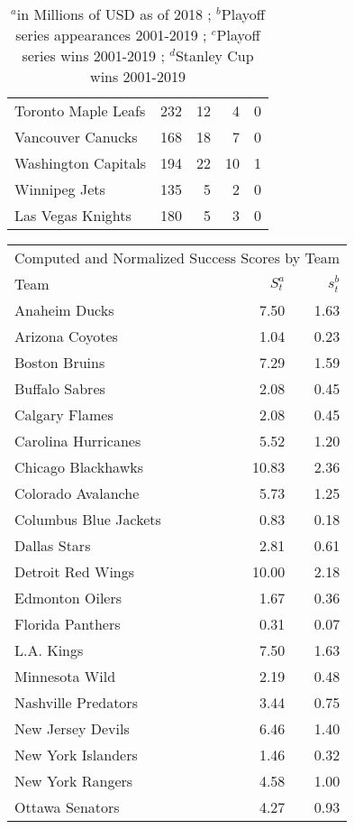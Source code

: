 \documentclass[11pt]{report}            %
\begin{document}
\begin{table}[htp]
\begin{tabular}{lrrrr}
Toronto Maple Leafs & 232 &  12 &   4 &   0 \\ 
Vancouver Canucks & 168 &  18 &   7 &   0 \\ 
Washington Capitals & 194 &  22 &  10 &   1 \\ 
Winnipeg Jets & 135 &   5 &   2 &   0 \\ 
Las Vegas Knights & 180 &   5 &   3 &   0 \\ 
\hline
\end{tabular}
\caption{$^a$in Millions of USD as of 2018 \cite{money}; $^b$Playoff series appearances 2001-2019 \cite{stats}; $^c$Playoff series wins 2001-2019 \cite{stats}; $^d$Stanley Cup wins 2001-2019 \cite{stats}}
\label{table:Revenue}
\end{table}

\begin{table}[htp]
\centering
\begin{tabular}{lrr}
\hline
\multicolumn{3}{c}{Computed and Normalized Success Scores by Team} \\
Team & $S_t^a$ & $s_t^b$ \\ 
\hline
Anaheim Ducks & 7.50 & 1.63 \\ 
Arizona Coyotes & 1.04 & 0.23 \\ 
Boston Bruins & 7.29 & 1.59 \\ 
Buffalo Sabres & 2.08 & 0.45 \\ 
Calgary Flames & 2.08 & 0.45 \\ 
Carolina Hurricanes & 5.52 & 1.20 \\ 
Chicago Blackhawks & 10.83 & 2.36 \\ 
Colorado Avalanche & 5.73 & 1.25 \\ 
Columbus Blue Jackets & 0.83 & 0.18 \\ 
Dallas Stars & 2.81 & 0.61 \\ 
Detroit Red Wings & 10.00 & 2.18 \\ 
Edmonton Oilers & 1.67 & 0.36 \\ 
Florida Panthers & 0.31 & 0.07 \\ 
L.A. Kings & 7.50 & 1.63 \\ 
Minnesota Wild & 2.19 & 0.48 \\ 
Nashville Predators & 3.44 & 0.75 \\ 
New Jersey Devils & 6.46 & 1.40 \\ 
New York Islanders & 1.46 & 0.32 \\ 
New York Rangers & 4.58 & 1.00 \\ 
Ottawa Senators & 4.27 & 0.93 \\ 

\end{tabular}
\end{table}
\end{document}
